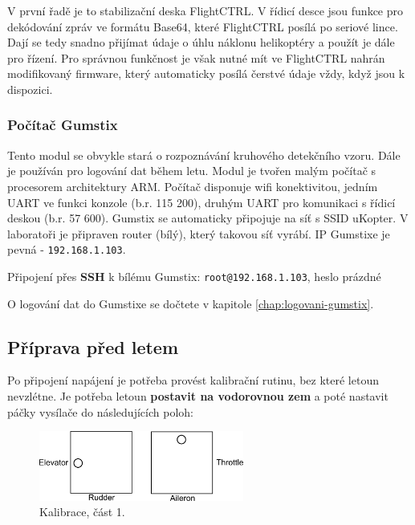 \documentclass[11pt, a4paper]{article}
\begin{document}
V první řadě je to stabilizační deska FlightCTRL. V řídicí desce jsou funkce pro dekódování zpráv ve formátu Base64, které FlightCTRL posílá po seriové lince. Dají se tedy snadno přijímat údaje o úhlu náklonu helikoptéry a použít je dále pro řízení. Pro správnou funkčnost je však nutné mít ve FlightCTRL nahrán modifikovaný firmware, který automaticky posílá čerstvé údaje vždy, když jsou k dispozici.

\subsubsection{Počítač Gumstix}

Tento modul se obvykle stará o rozpoznávání kruhového detekčního vzoru. Dále je používán pro logování dat během letu. Modul je tvořen malým počítač s procesorem architektury ARM. Počítač disponuje wifi konektivitou, jedním UART ve funkci konzole (b.r. 115 200), druhým UART pro komunikaci s řídicí deskou (b.r. 57 600). Gumstix se automaticky připojuje na síť s SSID uKopter. V laboratoři je připraven router (bílý), který takovou síť vyrábí. IP Gumstixe je pevná - \texttt{192.168.1.103}.

Připojení přes \textbf{SSH} k bílému Gumstix: \texttt{root@192.168.1.103}, heslo prázdné

O logování dat do Gumstixe se dočtete v kapitole \ref{chap:logovani-gumstix}.

\subsection{Příprava před letem}

Po připojení napájení je potřeba provést kalibrační rutinu, bez které letoun nevzlétne. Je potřeba letoun \textbf{postavit na vodorovnou zem} a poté nastavit páčky vysílače do následujících poloh:

\begin{figure}[h]
\begin{center}
\includegraphics[width=0.6\textwidth]{fig/kalibrace1.png}
\caption{Kalibrace, část 1.}
\label{fig:flightctrl}
\end{center}
\end{figure}
\end{document}
